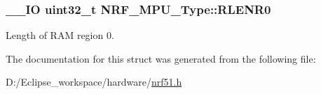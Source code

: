 \subsubsection[{R\+L\+E\+N\+R0}]{\setlength{\rightskip}{0pt plus 5cm}\+\_\+\+\_\+\+I\+O uint32\+\_\+t N\+R\+F\+\_\+\+M\+P\+U\+\_\+\+Type\+::\+R\+L\+E\+N\+R0}\label{struct_n_r_f___m_p_u___type_a68229ed01c4052fbe934fdd7e3842a9e}
Length of R\+A\+M region 0. 

The documentation for this struct was generated from the following file\+:\begin{DoxyCompactItemize}
\item 
D\+:/\+Eclipse\+\_\+workspace/hardware/\hyperlink{nrf51_8h}{nrf51.\+h}\end{DoxyCompactItemize}
